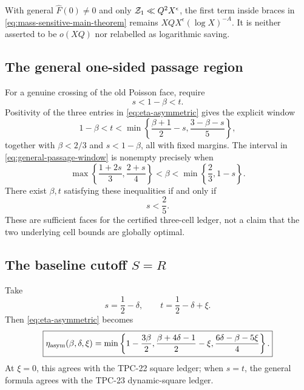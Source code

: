 \begin{remark}
\label{rem:soft-not-log}
With general \(\widehat F(0)\ne0\) and only
\(\mathcal Z_1\ll Q^2X^\epsilon\), the first term inside braces in
\eqref{eq:mass-sensitive-main-theorem} remains
\(XQX^\epsilon(\log X)^{-A}\).  It is neither asserted to be
\(o(XQ)\) nor relabelled as logarithmic saving.
\end{remark}

\subsection{The general one-sided passage region}

For a genuine crossing of the old Poisson face, require
\begin{equation}
 s<1-\beta<t.
 \label{eq:general-poisson-crossing}
\end{equation}
Positivity of the three entries in \eqref{eq:eta-asymmetric} gives the
explicit window
\begin{equation}
 \boxed{
 1-\beta<t<
 \min\left\{
 \frac{\beta+1}{2}-s,
 \frac{3-\beta-s}{5}
 \right\},}
 \label{eq:general-passage-window}
\end{equation}
together with \(\beta<2/3\) and \(s<1-\beta\), all with fixed
margins.  The interval in \eqref{eq:general-passage-window} is
nonempty precisely when
\begin{equation}
 \max\left\{\frac{1+2s}{3},\frac{2+s}{4}\right\}
 <\beta<\min\left\{\frac23,1-s\right\}.
 \label{eq:general-beta-window}
\end{equation}
There exist \(\beta,t\) satisfying these inequalities if and only if
\begin{equation}
 \boxed{s<\frac25.}
 \label{eq:general-s-frontier}
\end{equation}
These are sufficient faces for the certified three-cell ledger, not a
claim that the two underlying cell bounds are globally optimal.

\subsection{The baseline cutoff
\texorpdfstring{\(S=R\)}{S=R}}

Take
\begin{equation}
 s=\frac12-\delta,\qquad
 t=\frac12-\delta+\xi.
 \label{eq:Rxi-substitution}
\end{equation}
Then \eqref{eq:eta-asymmetric} becomes
\begin{equation}
 \boxed{
 \eta_{\rm asym}(\beta,\delta,\xi)
 =\min\left\{
 1-\frac{3\beta}{2},
 \frac{\beta+4\delta-1}{2}-\xi,
 \frac{6\delta-\beta-5\xi}{4}
 \right\}.}
 \label{eq:eta-asym-special}
\end{equation}
At \(\xi=0\), this agrees with the TPC-22 square ledger; when
\(s=t\), the general formula agrees with the TPC-23 dynamic-square
ledger.

